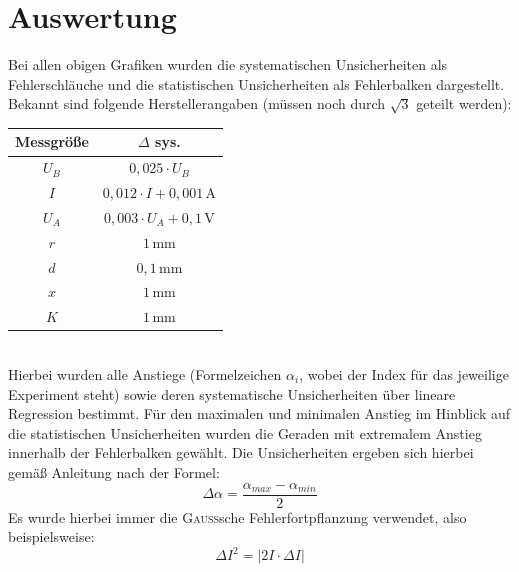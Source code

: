 \documentclass[a4paper,12pt]{article}
\begin{document}
\section{Auswertung}
Bei allen obigen Grafiken wurden die systematischen Unsicherheiten als Fehlerschläuche und die statistischen Unsicherheiten als Fehlerbalken dargestellt. Bekannt sind folgende Herstellerangaben (müssen noch durch $\sqrt{3}$ geteilt werden):
\begin{table}[h!]
\centering 
\begin{tabular}{|c|c|}\hline
Messgröße & $\Delta$ sys. \\ \hline
$U_B$ & $0,025\cdot U_B$ \\
$I$ & $0,012\cdot I+0,001\,$A \\ 
$U_A$ & $0,003\cdot U_A +0,1\,\mathrm{V}$ \\
$r$ & $1\,$mm \\ 
$d$ & $0,1\,$mm \\
$x$ & $1\,$mm \\ 
$K$ & $1\,$mm \\ \hline
\end{tabular}
\end{table}\\
Hierbei wurden alle Anstiege (Formelzeichen $\alpha_i$, wobei der Index für das jeweilige Experiment steht) sowie deren systematische Unsicherheiten über lineare Regression bestimmt. Für den maximalen und minimalen Anstieg im Hinblick auf die statistischen Unsicherheiten wurden die Geraden mit extremalem Anstieg innerhalb der Fehlerbalken gewählt. Die Unsicherheiten ergeben sich hierbei gemäß Anleitung nach der Formel:
$$\Delta\alpha = \frac{\alpha_{max}-\alpha_{min}}{2}$$
Es wurde hierbei immer die \textsc{Gauss}sche Fehlerfortpflanzung verwendet, also beispielsweise:
$$\Delta I^2=|2I\cdot\Delta I|$$
\end{document}

